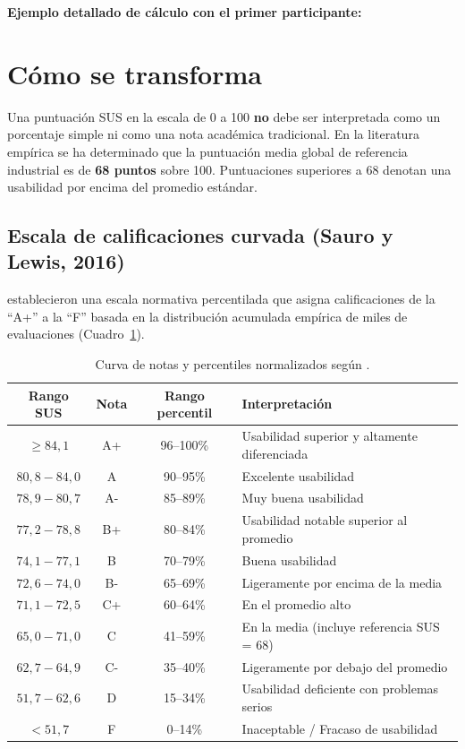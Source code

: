 \noindent
\textbf{Ejemplo detallado de cálculo con el primer participante:}

\medskip
{}

\section{Cómo se transforma}
Una puntuación SUS en la escala de 0 a 100 \textbf{no} debe ser interpretada como un porcentaje simple ni como una nota académica tradicional. En la literatura empírica se ha determinado que la puntuación media global de referencia industrial es de \textbf{68 puntos} sobre 100. Puntuaciones superiores a 68 denotan una usabilidad por encima del promedio estándar.

\subsection{Escala de calificaciones curvada (Sauro y Lewis, 2016)}
\textcite{Sauro2016} establecieron una escala normativa percentilada que asigna calificaciones de la \enquote{A+} a la \enquote{F} basada en la distribución acumulada empírica de miles de evaluaciones (Cuadro~\ref{tab:sauro-lewis}).

\begin{table}[htbp]
\centering
\small
\begin{tabular}{cccl}
\toprule
\textbf{Rango SUS} & \textbf{Nota} & \textbf{Rango percentil} & \textbf{Interpretación} \\
\midrule
$\ge 84{,}1$ & A+ & 96--100\% & Usabilidad superior y altamente diferenciada \\
$80{,}8 - 84{,}0$ & A  & 90--95\%  & Excelente usabilidad \\
$78{,}9 - 80{,}7$ & A- & 85--89\%  & Muy buena usabilidad \\
$77{,}2 - 78{,}8$ & B+ & 80--84\%  & Usabilidad notable superior al promedio \\
$74{,}1 - 77{,}1$ & B  & 70--79\%  & Buena usabilidad \\
$72{,}6 - 74{,}0$ & B- & 65--69\%  & Ligeramente por encima de la media \\
$71{,}1 - 72{,}5$ & C+ & 60--64\%  & En el promedio alto \\
$65{,}0 - 71{,}0$ & C  & 41--59\%  & En la media (incluye referencia SUS = 68) \\
$62{,}7 - 64{,}9$ & C- & 35--40\%  & Ligeramente por debajo del promedio \\
$51{,}7 - 62{,}6$ & D  & 15--34\%  & Usabilidad deficiente con problemas serios \\
$< 51{,}7$        & F  & 0--14\%   & Inaceptable / Fracaso de usabilidad \\
\bottomrule
\end{tabular}
\caption{Curva de notas y percentiles normalizados según \textcite{Sauro2016}.}
\label{tab:sauro-lewis}
\end{table}

